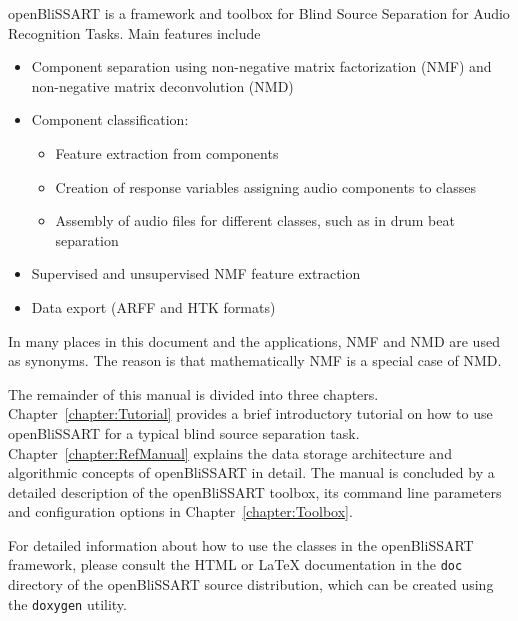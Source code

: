 %
%


openBliSSART is a framework and toolbox for Blind Source Separation for Audio
Recognition Tasks. Main features include

\begin{itemize}
\item Component separation using non-negative matrix factorization (NMF)
  \cite{LeeSeung1999,Smaragdis2003,LeeSeung2001} and non-negative matrix deconvolution
  (NMD) \cite{Smaragdis2004}
\item Component classification:
\begin{itemize}
    \item Feature extraction from components
    \item Creation of response variables assigning audio components to classes
    \item Assembly of audio files for different
    classes, such as in drum beat separation \cite{Virtanen2005}
\end{itemize}
\item Supervised and unsupervised NMF feature extraction
\item Data export (ARFF \cite{Weka} and HTK \cite{HTKBook} formats)
\end{itemize}

\begin{leftbar}
In many places in this document and the applications, NMF and NMD are used
as synonyms. The reason is that mathematically NMF is a special case of NMD.
\end{leftbar}

The remainder of this manual is divided into three chapters. Chapter~\ref{chapter:Tutorial} provides
a brief introductory tutorial on how to use openBliSSART for a typical blind
source separation task. Chapter~\ref{chapter:RefManual} explains the data storage architecture and algorithmic concepts of openBliSSART in detail. The manual is concluded by a detailed description of the openBliSSART toolbox, its command line parameters and configuration options in Chapter~\ref{chapter:Toolbox}.

For detailed information about how to use the classes in the openBliSSART
framework, please consult the HTML or LaTeX documentation in the {\tt doc}
directory of the openBliSSART source distribution, which can be created using
the {\tt doxygen} utility.

